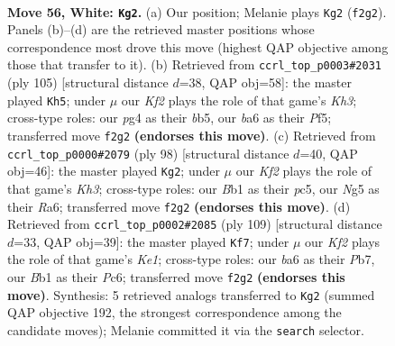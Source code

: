 \documentclass[11pt]{article}
\begin{document}
\clearpage

\begin{figure}[p]\centering
\begin{subfigure}{0.46\textwidth}\centering
\resizebox{\linewidth}{!}{%
\newchessgame
\chessboard[
  setfen={7k/2r2p1p/b5p1/4P1N1/1n3Pp1/8/5K1P/1B6 w - - 2 56},
  showmover=false,
  pgfstyle=straightmove, color=movearrow, markmove={f2-g2}
]}
\caption{}
\end{subfigure}\hfill
\begin{subfigure}{0.46\textwidth}\centering
\resizebox{\linewidth}{!}{%
\newchessgame
\chessboard[
  setfen={8/2b5/1p2p2k/1Bn2p2/Pp3P2/1P2P3/2KN4/8 b - - 0 53},
  showmover=false,
  pgfstyle=straightmove, color=movearrow, markmove={h6-h5}
]}
\caption{}
\end{subfigure}
\\[4pt]
\begin{subfigure}{0.46\textwidth}\centering
\resizebox{\linewidth}{!}{%
\newchessgame
\chessboard[
  setfen={4r2k/7p/R5pN/2p2pP1/p6P/7K/2P2P2/3n4 w - - 2 50},
  showmover=false,
  pgfstyle=straightmove, color=movearrow, markmove={h3-g2}
]}
\caption{}
\end{subfigure}\hfill
\begin{subfigure}{0.46\textwidth}\centering
\resizebox{\linewidth}{!}{%
\newchessgame
\chessboard[
  setfen={4k3/pp6/1npbp3/8/PP1PP1K1/8/1N6/4B3 b - - 26 55},
  showmover=false,
  pgfstyle=straightmove, color=movearrow, markmove={e8-f7}
]}
\caption{}
\end{subfigure}
\caption{\textbf{Move 56, White: \texttt{Kg2}.} (a) Our position; Melanie plays \texttt{Kg2} (\texttt{f2g2}). Panels (b)--(d) are the retrieved master positions whose correspondence most drove this move (highest QAP objective among those that transfer to it). (b) Retrieved from \texttt{ccrl\_top\_p0003\#2031} (ply 105) [structural distance $d$=38, QAP obj=58]: the master played \texttt{Kh5}; under $\mu$ our \emph{Kf2} plays the role of that game's \emph{Kh3}; cross-type roles: our \emph{p}g4 as their \emph{b}b5, our \emph{b}a6 as their \emph{P}f5; transferred move \texttt{f2g2} \textbf{(endorses this move)}. (c) Retrieved from \texttt{ccrl\_top\_p0000\#2079} (ply 98) [structural distance $d$=40, QAP obj=46]: the master played \texttt{Kg2}; under $\mu$ our \emph{Kf2} plays the role of that game's \emph{Kh3}; cross-type roles: our \emph{B}b1 as their \emph{p}c5, our \emph{N}g5 as their \emph{R}a6; transferred move \texttt{f2g2} \textbf{(endorses this move)}. (d) Retrieved from \texttt{ccrl\_top\_p0002\#2085} (ply 109) [structural distance $d$=33, QAP obj=39]: the master played \texttt{Kf7}; under $\mu$ our \emph{Kf2} plays the role of that game's \emph{Ke1}; cross-type roles: our \emph{b}a6 as their \emph{P}b7, our \emph{B}b1 as their \emph{P}c6; transferred move \texttt{f2g2} \textbf{(endorses this move)}. Synthesis: 5 retrieved analogs transferred to \texttt{Kg2} (summed QAP objective 192, the strongest correspondence among the candidate moves); Melanie committed it via the \texttt{search} selector.}
\label{fig:thought-m110}
\end{figure}
\end{document}
